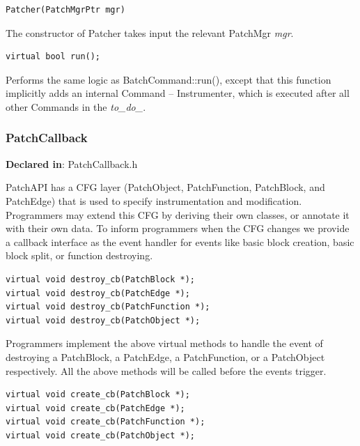 \documentclass[11pt]{article}
\begin{document}
\begin{verbatim}
Patcher(PatchMgrPtr mgr)

\end{verbatim}



The constructor of Patcher takes input the relevant PatchMgr \emph{mgr}.


\begin{verbatim}
virtual bool run();

\end{verbatim}



Performs the same logic as BatchCommand::run(), except that this function
implicitly adds an internal Command -- Instrumenter, which is executed after all
other Commands in the \emph{to\_do\_}.

\subsubsection{PatchCallback}
\label{sec-3.2.7}

\textbf{Declared in}: PatchCallback.h

PatchAPI has a CFG layer (PatchObject, PatchFunction, PatchBlock, and PatchEdge)
that is used to specify instrumentation and modification. Programmers may extend
this CFG by deriving their own classes, or annotate it with their own data. To
inform programmers when the CFG changes we provide a callback interface as the
event handler for events like basic block creation, basic block split, or
function destroying.


\begin{verbatim}
virtual void destroy_cb(PatchBlock *);
virtual void destroy_cb(PatchEdge *);
virtual void destroy_cb(PatchFunction *);
virtual void destroy_cb(PatchObject *);

\end{verbatim}



Programmers implement the above virtual methods to handle the event of
destroying a PatchBlock, a PatchEdge, a PatchFunction, or a PatchObject
respectively. All the above methods will be called before the events trigger.


\begin{verbatim}
virtual void create_cb(PatchBlock *);
virtual void create_cb(PatchEdge *);
virtual void create_cb(PatchFunction *);
virtual void create_cb(PatchObject *);

\end{verbatim}
\end{document}
